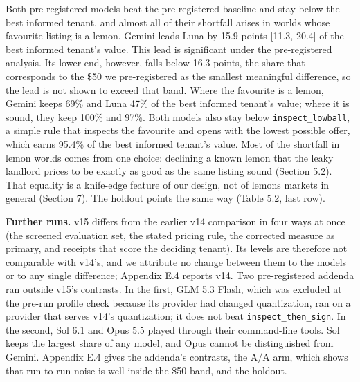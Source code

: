 Both pre-registered models beat the pre-registered baseline and stay below the best informed tenant, and almost all
of their shortfall arises in worlds whose favourite listing is a lemon. Gemini leads Luna by 15.9 points {[}11.3, 20.4{]}
of the best informed tenant's value. This lead is significant under the pre-registered analysis. Its lower end,
however, falls below 16.3 points, the share that corresponds to the \$50 we pre-registered as the smallest meaningful
difference, so the lead is not shown to exceed that band. Where the favourite is a lemon, Gemini keeps 69\% and Luna
47\% of the best informed tenant's value; where it is sound, they keep 100\% and 97\%. Both models also stay below
\texttt{inspect\_\allowbreak{}lowball}, a simple rule that inspects the favourite and opens with the lowest possible offer, which earns
95.4\% of the best informed tenant's value. Most of the shortfall in lemon worlds comes from one choice: declining a
known lemon that the leaky landlord prices to be exactly as good as the same listing sound (Section 5.2). That
equality is a knife-edge feature of our design, not of lemons markets in general (Section 7). The holdout points the
same way (Table 5.2, last row).

\textbf{Further runs.} v15 differs from the earlier v14 comparison in four ways at once (the screened evaluation set, the
stated pricing rule, the corrected measure as primary, and receipts that score the deciding tenant). Its levels are
therefore not comparable with v14's, and we attribute no change between them to the models or to any single
difference; Appendix E.4 reports v14. Two pre-registered addenda ran outside v15's contrasts. In the first, GLM 5.3
Flash, which was excluded at the pre-run profile check because its provider had changed quantization, ran on a
provider that serves v14's quantization; it does not beat \texttt{inspect\_\allowbreak{}then\_\allowbreak{}sign}. In the second, Sol 6.1 and Opus 5.5
played through their command-line tools. Sol keeps the largest share of any model, and Opus cannot be distinguished
from Gemini. Appendix E.4 gives the addenda's contrasts, the A/A arm, which shows that run-to-run noise is well inside the \$50 band, and the holdout.

